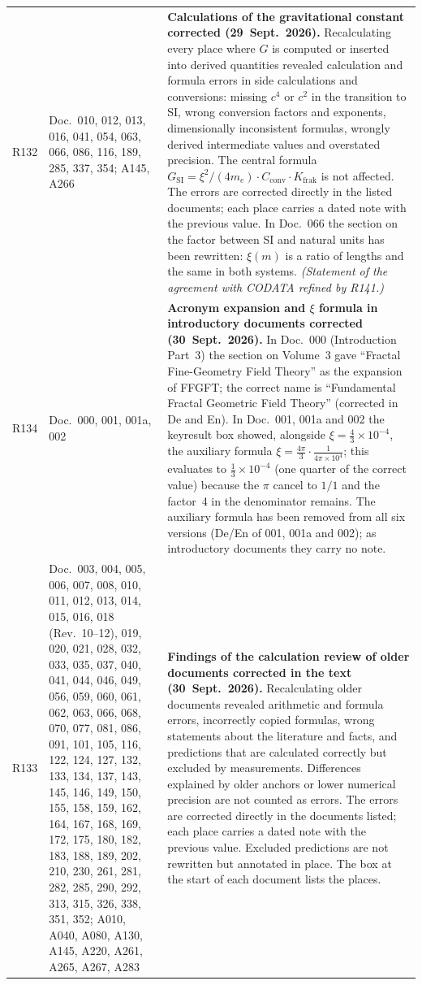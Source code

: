 \begin{longtable}{@{}p{0.9cm}p{3.1cm}p{10.2cm}@{}}
R132 & Doc.~010, 012, 013, 016, 041, 054, 063, 066, 086, 116, 189, 285, 337, 354; A145, A266 & \textbf{Calculations of the gravitational constant corrected (29~Sept.~2026).} Recalculating every place where $G$ is computed or inserted into derived quantities revealed calculation and formula errors in side calculations and conversions: missing $c^4$ or $c^2$ in the transition to SI, wrong conversion factors and exponents, dimensionally inconsistent formulas, wrongly derived intermediate values and overstated precision. The central formula $G_{\text{SI}}=\xi^2/(4m_e)\cdot C_{\text{conv}}\cdot K_{\text{frak}}$ is not affected. The errors are corrected directly in the listed documents; each place carries a dated note with the previous value. In Doc.~066 the section on the factor between SI and natural units has been rewritten: $\xi(m)$ is a ratio of lengths and the same in both systems. \emph{(Statement of the agreement with CODATA refined by R141.)} \\
R134 & Doc.~000, 001, 001a, 002 & \textbf{Acronym expansion and $\xi$ formula in introductory documents corrected (30~Sept.~2026).} In Doc.~000 (Introduction Part~3) the section on Volume~3 gave ``Fractal Fine-Geometry Field Theory'' as the expansion of FFGFT; the correct name is ``Fundamental Fractal Geometric Field Theory'' (corrected in De and En). In Doc.~001, 001a and 002 the keyresult box showed, alongside $\xi=\frac{4}{3}\times10^{-4}$, the auxiliary formula $\xi = \frac{4\pi}{3}\cdot\frac{1}{4\pi\times10^4}$; this evaluates to $\frac{1}{3}\times10^{-4}$ (one quarter of the correct value) because the $\pi$ cancel to $1/1$ and the factor~4 in the denominator remains. The auxiliary formula has been removed from all six versions (De/En of 001, 001a and 002); as introductory documents they carry no note. \\
R133 & Doc.~003, 004, 005, 006, 007, 008, 010, 011, 012, 013, 014, 015, 016, 018 (Rev.~10--12), 019, 020, 021, 028, 032, 033, 035, 037, 040, 041, 044, 046, 049, 056, 059, 060, 061, 062, 063, 066, 068, 070, 077, 081, 086, 091, 101, 105, 116, 122, 124, 127, 132, 133, 134, 137, 143, 145, 146, 149, 150, 155, 158, 159, 162, 164, 167, 168, 169, 172, 175, 180, 182, 183, 188, 189, 202, 210, 230, 261, 281, 282, 285, 290, 292, 313, 315, 326, 338, 351, 352; A010, A040, A080, A130, A145, A220, A261, A265, A267, A283 & \textbf{Findings of the calculation review of older documents corrected in the text (30~Sept.~2026).} Recalculating older documents revealed arithmetic and formula errors, incorrectly copied formulas, wrong statements about the literature and facts, and predictions that are calculated correctly but excluded by measurements. Differences explained by older anchors or lower numerical precision are not counted as errors. The errors are corrected directly in the documents listed; each place carries a dated note with the previous value. Excluded predictions are not rewritten but annotated in place. The box at the start of each document lists the places. \\

\end{longtable}
